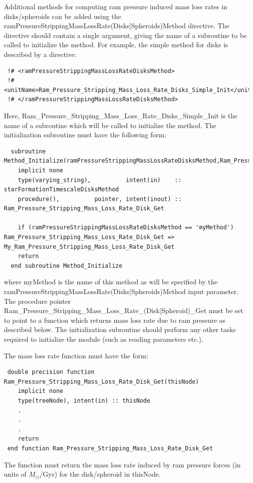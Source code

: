 Additional methods for computing ram pressure induced mass loss rates in disks/spheroids can be added using the {\normalfont \ttfamily ramPressureStrippingMassLossRate(Disks|Spheroids)Method} directive. The directive should contain a single argument, giving the name of a subroutine to be called to initialize the method. For example, the {\normalfont \ttfamily simple} method for disks is described by a directive:
\begin{verbatim}
 !# <ramPressureStrippingMassLossRateDisksMethod>
 !#  <unitName>Ram_Pressure_Stripping_Mass_Loss_Rate_Disks_Simple_Init</unitName>
 !# </ramPressureStrippingMassLossRateDisksMethod>
\end{verbatim}
Here, {\normalfont \ttfamily Ram\_Pressure\_Stripping\_Mass\_Loss\_Rate\_Disks\_Simple\_Init} is the name of a subroutine which will be called to initialize the method. The initialization subroutine must have the following form:
\begin{verbatim}
  subroutine Method_Initialize(ramPressureStrippingMassLossRateDisksMethod,Ram_Pressure_Stripping_Mass_Loss_Rate_Disk_Get)
    implicit none
    type(varying_string),          intent(in)    :: starFormationTimescaleDisksMethod
    procedure(),          pointer, intent(inout) :: Ram_Pressure_Stripping_Mass_Loss_Rate_Disk_Get
    
    if (ramPressureStrippingMassLossRateDisksMethod == 'myMethod') Ram_Pressure_Stripping_Mass_Loss_Rate_Disk_Get => My_Ram_Pressure_Stripping_Mass_Loss_Rate_Disk_Get
    return
  end subroutine Method_Initialize
\end{verbatim}
where {\normalfont \ttfamily myMethod} is the name of this method as will be specified by the {\normalfont \ttfamily ramPressureStrippingMassLossRate(Disks|Spheroids)Method} input parameter. The procedure pointer {\normalfont \ttfamily Ram\_Pressure\_Stripping\_Mass\_Loss\_Rate\_(Disk|Spheroid)\_Get} must be set to point to a function which returns mass loss rate due to ram pressure as described below. The initialization subroutine should perform any other tasks required to initialize the module (such as reading parameters etc.).

The mass loss rate function must have the form:
\begin{verbatim}
 double precision function Ram_Pressure_Stripping_Mass_Loss_Rate_Disk_Get(thisNode)
    implicit none
    type(treeNode), intent(in) :: thisNode
    .
    .
    .
    return
 end function Ram_Pressure_Stripping_Mass_Loss_Rate_Disk_Get
\end{verbatim}
The function must return the mass loss rate induced by ram pressure forces (in units of $M_\odot$/Gyr) for the disk/spheroid in {\normalfont \ttfamily thisNode}.

